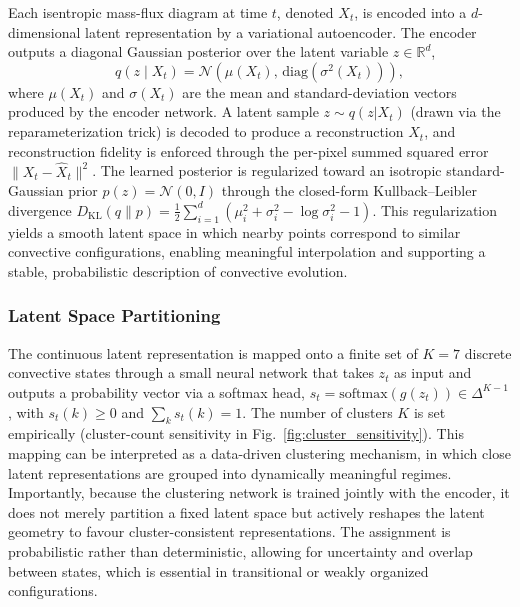 \documentclass[11pt]{article}
\begin{document}
Each isentropic mass-flux diagram at time $t$, denoted $X_t$, is encoded into a $d$-dimensional latent representation by a variational autoencoder. The encoder outputs a diagonal Gaussian posterior over the latent variable $z\in\mathbb{R}^d$,
\[
q(z \mid X_t) = \mathcal{N}\!\left(\mu(X_t),\,\mathrm{diag}(\sigma^2(X_t))\right),
\]
where $\mu(X_t)$ and $\sigma(X_t)$ are the mean and standard-deviation vectors produced by the encoder network. A latent sample $z\sim q(z|X_t)$ (drawn via the reparameterization trick) is decoded to produce a reconstruction $\hat{X}_t$, and reconstruction fidelity is enforced through the per-pixel summed squared error $\|X_t-\hat{X}_t\|^2$. The learned posterior is regularized toward an isotropic standard-Gaussian prior $p(z)=\mathcal{N}(0,I)$ through the closed-form Kullback--Leibler divergence $D_{\mathrm{KL}}(q\|p) = \tfrac{1}{2}\sum_{i=1}^d\!\left(\mu_i^2+\sigma_i^2-\log\sigma_i^2-1\right)$. This regularization yields a smooth latent space in which nearby points correspond to similar convective configurations, enabling meaningful interpolation and supporting a stable, probabilistic description of convective evolution.

\subsubsection{Latent Space Partitioning}

The continuous latent representation is mapped onto a finite set of $K=7$ discrete convective states through a small neural network that takes $z_t$ as input and outputs a probability vector via a softmax head, $s_t = \mathrm{softmax}(g(z_t)) \in \Delta^{K-1}$, with $s_t(k)\ge 0$ and $\sum_k s_t(k)=1$. The number of clusters $K$ is set empirically (cluster-count sensitivity in Fig.~\ref{fig:cluster_sensitivity}). This mapping can be interpreted as a data-driven clustering mechanism, in which close latent representations are grouped into dynamically meaningful regimes. Importantly, because the clustering network is trained jointly with the encoder, it does not merely partition a fixed latent space but actively reshapes the latent geometry to favour cluster-consistent representations. The assignment is probabilistic rather than deterministic, allowing for uncertainty and overlap between states, which is essential in transitional or weakly organized configurations.
\end{document}
